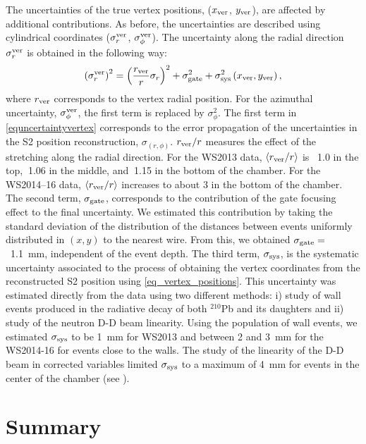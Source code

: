 \documentclass[a4paper,11pt]{article}
\begin{document}
The uncertainties of the true vertex positions, ($x_{\rm ver}$, $y_{\rm ver}$), are affected by additional contributions. As before, the uncertainties are described using cylindrical coordinates ($\sigma_r^{\rm ver}$, $\sigma_\phi^{\rm ver}$). The uncertainty along the radial direction $\sigma_r^{\rm ver}$ is obtained in the following way:
\begin{equation}
\left(\sigma_r^{\rm ver}\right)^2 = \left(\frac{r_{\rm ver}}{r} \sigma_r \right)^2 + \sigma_{\rm gate}^2 + \sigma_{\rm sys}^2 \left(x_{\rm ver}, y_{\rm ver} \right),
\label{equncertaintyvertex}
\end{equation}
 where $r_{\rm ver}$ corresponds to the vertex radial position.
For the azimuthal uncertainty, $\sigma_\phi^{\rm ver}$, the first term is replaced by $\sigma_\phi^2$. The first term in \cref{equncertaintyvertex} corresponds to the error propagation of the  uncertainties in the S2 position reconstruction,  $\sigma_{\left(r,\phi\right)}$. $r_{\rm ver}/r$ measures the effect of the stretching along the radial direction. For the WS2013 data, $\left<r_{\rm ver}/r\right>$ is ~1.0 in the top, $~$1.06 in the middle, and $~$1.15 in the bottom of the chamber. For the WS2014--16 data, $\left<r_{\rm ver}/r\right>$ increases to about 3 in the bottom of the chamber. The second term, $\sigma_{\rm gate}$, corresponds to the contribution of the gate focusing effect to the final uncertainty. We estimated this contribution by taking the standard deviation of the distribution of the distances between events uniformly distributed in $(x, y)$ to the nearest wire. From this, we obtained $\sigma_{\rm gate} = $~1.1~mm, independent of the event depth. The third term, $\sigma_{\rm sys}$, is the systematic uncertainty associated to the process of obtaining the vertex coordinates from the reconstructed S2 position using \cref{eq_vertex_positions}. This uncertainty was estimated directly from the data using two different methods: i)  study of  wall events produced in the radiative decay of both ${}^{\mathrm{210}}$Pb and its daughters and ii) study of the neutron D-D beam linearity. Using the population of wall events, we estimated $\sigma_{\rm sys}$ to be 1~mm for WS2013 and between 2 and 3~mm for the WS2014-16 for events close to the walls. The study of the linearity of the D-D beam in corrected variables limited $\sigma_{\rm sys}$ to a maximum of 4~mm for events in the center of the chamber (see \cite{LUX2015_ReanalysisPRD}).

\section{Summary}
\end{document}

